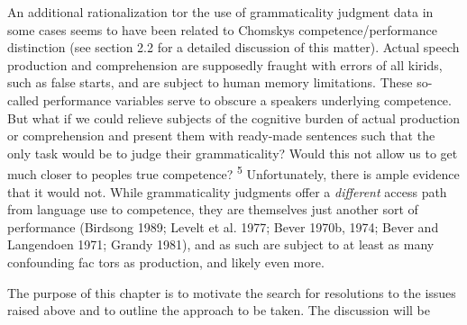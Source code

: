 \begin{styleTextbody}
An additional rationalization tor the use of grammaticality judgment data in some cases seems to have been related to Chomsky{\textquotesingle}s competence/performance distinction (see section 2.2 for a detailed discussion of this matter). Actual speech production and comprehension are supposedly fraught with errors of all kirids, such as false starts, and are subject to human memory limitations. These so-called performance variables serve to obscure a speaker{\textquotesingle}s underlying competence. But what if we could relieve subjects of the {\textquotedbl}cognitive burden{\textquotedbl} of actual production or comprehension and present them with ready-made sentences such that the only task would be to judge their grammaticality? Would this not allow us to get much closer to people{\textquotesingle}s true competence? \textsuperscript{5}\textsuperscript{ }Unfortunately, there is ample evidence that it would not. While grammaticality judgments offer a \textit{different}\textit{ }access path from language use to competence, they are themselves just another sort of performance (Birdsong 1989; Levelt et al. 1977; Bever 1970b, 1974; Bever and Langendoen 1971; Grandy 1981), and as such are subject to at least as many confounding fac\- tors as production, and likely even more.
\end{styleTextbody}


\begin{styleTextbody}
The purpose of this chapter is to motivate the search for resolutions to the issues raised above and to outline the approach to be taken. The discussion will be
\end{styleTextbody}


